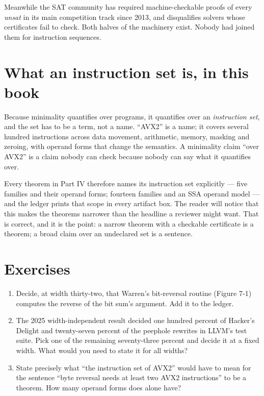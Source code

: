 Meanwhile the SAT community has required machine-checkable proofs of every \emph{unsat} in its main competition track since 2013, and disqualifies solvers whose certificates fail to check. Both halves of the machinery exist. Nobody had joined them for instruction sequences.

\section{What an instruction set is, in this book}
\label{sec:isa}

Because minimality quantifies over programs, it quantifies over an \emph{instruction set}, and the set has to be a term, not a name. \enquote{AVX2} is a name; it covers several hundred instructions across data movement, arithmetic, memory, masking and zeroing, with operand forms that change the semantics. A minimality claim \enquote{over AVX2} is a claim nobody can check because nobody can say what it quantifies over.

Every theorem in Part IV therefore names its instruction set explicitly --- five families and their operand forms; fourteen families and an SSA operand model --- and the ledger prints that scope in every artifact box. The reader will notice that this makes the theorems narrower than the headline a reviewer might want. That is correct, and it is the point: a narrow theorem with a checkable certificate is a theorem; a broad claim over an undeclared set is a sentence.

\section{Exercises}

\begin{enumerate}
\item Decide, at width thirty-two, that Warren's bit-reversal routine (Figure 7-1) computes the reverse of the bit sum's argument. Add it to the ledger.
\item The 2025 width-independent result decided one hundred percent of Hacker's Delight and twenty-seven percent of the peephole rewrites in LLVM's test suite. Pick one of the remaining seventy-three percent and decide it at a fixed width. What would you need to state it for all widths?
\item State precisely what \enquote{the instruction set of AVX2} would have to mean for the sentence \enquote{byte reversal needs at least two AVX2 instructions} to be a theorem. How many operand forms does  alone have?
\end{enumerate}
